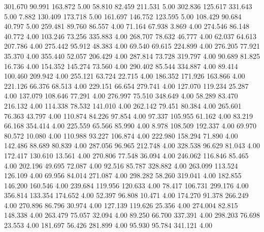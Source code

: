  301.670   90.991  163.872         5.00
  58.810   82.459  211.531         5.00
 302.836  125.617  331.643         5.00
   7.882  130.409  173.718         5.00
 161.697  146.752  123.595         5.00
 108.429   90.684   40.797         5.00
 259.481   89.760   86.557         4.00
  71.164   67.938    3.869         4.00
 274.546   86.148   40.772         4.00
 103.246   73.256  335.883         4.00
 268.707   78.632   46.777         4.00
  62.037   64.613  207.786         4.00
 275.442   95.912   48.383         4.00
  69.540   69.615  224.899         4.00
 276.205   77.921   35.370         4.00
 355.440   52.057  206.429         4.00
 287.814   73.728  319.797         4.00
  90.689   81.825   16.736         4.00
 154.352  145.274   73.560         4.00
 290.402   85.544  334.887         4.00
  89.414  100.460  209.942         4.00
 255.121   63.724   22.715         4.00
 186.352  171.926  163.866         4.00
 221.126   66.376   68.513         4.00
 229.151   66.654  279.741         4.00
 127.070  119.234   25.287         4.00
 137.079  108.646   77.291         4.00
 276.997   75.510  348.649         4.00
  58.289   83.470  216.132         4.00
 114.338   78.532  141.010         4.00
 262.142   79.451   80.384         4.00
 265.601   76.363   43.797         4.00
 110.874   84.226   97.854         4.00
  97.337  105.955   61.162         4.00
  83.219   66.168  354.414         4.00
 225.559   65.566   85.990         4.00
   8.978  108.509  192.337         4.00
  69.970   80.572   10.080         4.00
 110.988   93.227  106.874         4.00
 222.980  158.294   71.890         4.00
 142.486   88.689   80.839         4.00
 287.056   96.965  212.748         4.00
 328.538   96.629   81.043         4.00
 172.417  130.610   13.561         4.00
 270.806   77.548   36.094         4.00
 246.062  116.846   85.465         4.00
 202.196   49.695   72.087         4.00
  92.516   85.787  328.882         4.00
 263.099  113.524  126.109         4.00
  69.956   84.014  271.087         4.00
 298.282   58.260  319.041         4.00
 182.855  146.200  160.546         4.00
 239.684  119.956  120.633         4.00
  78.417  106.731  299.176         4.00
 356.814  133.354  174.652         4.00
  52.397   96.808   10.471         4.00
 174.270   91.378  266.249         4.00
 270.896   86.796   30.974         4.00
 127.139  119.626   25.356         4.00
 274.004   82.815  148.338         4.00
 263.479   75.057   32.094         4.00
  89.250   66.700  337.391         4.00
 298.203   76.698   23.553         4.00
 181.697   56.426  281.899         4.00
  95.930   95.784  341.121         4.00
